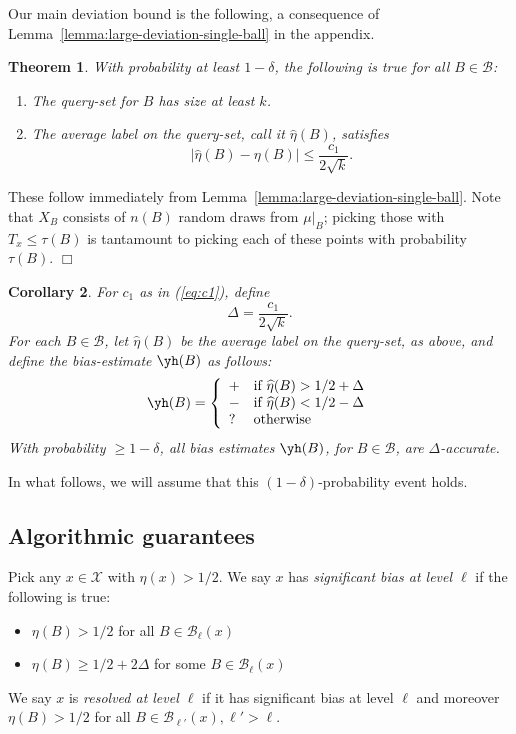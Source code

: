 \documentclass{article}
\def\X{{\mathcal X}}
\def\B{{\mathcal B}}
\newtheorem{thm}{Theorem}
\newtheorem{cor}[thm]{Corollary}
\newenvironment{proof}{\noindent {\sc Proof:}}{$\Box$ \medskip}
\begin{document}
Our main deviation bound is the following, a consequence of Lemma~\ref{lemma:large-deviation-single-ball} in the appendix.
\begin{thm}
With probability at least $1-\delta$, the following is true for all $B \in \B$:
\begin{enumerate}
\item[(a)] The query-set for $B$ has size at least $k$.
\item[(b)] The average label on the query-set, call it $\widehat{\eta}(B)$, satisfies
$$ \left| \widehat{\eta}(B) - \eta(B) \right| \leq \frac{c_1}{2\sqrt{k}}.$$
\end{enumerate}
\label{thm:large-deviation-bounds}
\end{thm}
\begin{proof}
These follow immediately from Lemma~\ref{lemma:large-deviation-single-ball}. Note that $X_B$ consists of $n(B)$ random draws from $\mu|_B$; picking those with $T_x \leq \tau(B)$ is tantamount to picking each of these points with probability $\tau(B)$.
\end{proof}

\begin{cor}
For $c_1$ as in (\ref{eq:c1}), define
$$ \Delta = \frac{c_1}{2 \sqrt{k}} .$$
For each $B \in \B$, let $\widehat{\eta}(B)$ be the average label on the query-set, as above, and define the bias-estimate $\yh(B)$ as follows:
$$ \yh(B)
= 
\left\{
\begin{array}{ll}
+ & \mbox{if $\widehat{\eta}(B) > 1/2 + \Delta$} \\
- & \mbox{if $\widehat{\eta}(B) < 1/2 - \Delta$} \\
? & \mbox{otherwise}
\end{array}
\right.
$$
With probability $\geq 1-\delta$, all bias estimates $\yh(B)$, for $B \in \B$, are $\Delta$-accurate.
\label{cor:accurate-bias-estimates}
\end{cor}
In what follows, we will assume that this $(1-\delta)$-probability event holds.

\subsection{Algorithmic guarantees}

Pick any $x \in \X$ with $\eta(x) > 1/2$. We say $x$ has {\it significant bias at level $\ell$} if the following is true:
\begin{itemize}
\item $\eta(B) > 1/2$ for all $B \in \B_\ell(x)$
\item $\eta(B) \geq 1/2 + 2\Delta$ for some $B \in \B_\ell(x)$
\end{itemize}
We say $x$ is {\it resolved at level $\ell$} if it has significant bias at level $\ell$ and moreover $\eta(B) > 1/2$ for all $B \in \B_{\ell'}(x), \ell' > \ell$.
\end{document}
